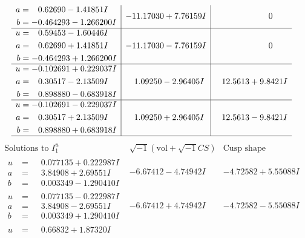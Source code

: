 \documentclass[1p]{elsarticle_modified}
\theoremstyle{definition}
\newcommand{\I}{\sqrt{-1}}
\begin{document}
$$\begin{array}{c|c|c}
\begin{aligned}
a &= \phantom{-}0.62690 - 1.41851 I \\
b &= -0.464293 - 1.266200 I\end{aligned}
 & -11.17030 + 7.76159 I & \phantom{-0.000000 } 0 \\ \hline\begin{aligned}
u &= \phantom{-}0.59453 - 1.60446 I \\
a &= \phantom{-}0.62690 + 1.41851 I \\
b &= -0.464293 + 1.266200 I\end{aligned}
 & -11.17030 - 7.76159 I & \phantom{-0.000000 } 0 \\ \hline\begin{aligned}
u &= -0.102691 + 0.229037 I \\
a &= \phantom{-}0.30517 - 2.13509 I \\
b &= \phantom{-}0.898880 - 0.683918 I\end{aligned}
 & \phantom{-}1.09250 - 2.96405 I & \phantom{-}12.5613 + 9.8421 I \\ \hline\begin{aligned}
u &= -0.102691 - 0.229037 I \\
a &= \phantom{-}0.30517 + 2.13509 I \\
b &= \phantom{-}0.898880 + 0.683918 I\end{aligned}
 & \phantom{-}1.09250 + 2.96405 I & \phantom{-}12.5613 - 9.8421 I\\
 \hline 
 \end{array}$$\newpage$$\begin{array}{c|c|c}  
\text{Solutions to }I^u_{1}& \I (\text{vol} + \sqrt{-1}CS) & \text{Cusp shape}\\
 \hline 
\begin{aligned}
u &= \phantom{-}0.077135 + 0.222987 I \\
a &= \phantom{-}3.84908 + 2.69551 I \\
b &= \phantom{-}0.003349 - 1.290410 I\end{aligned}
 & -6.67412 - 4.74942 I & -4.72582 + 5.55088 I \\ \hline\begin{aligned}
u &= \phantom{-}0.077135 - 0.222987 I \\
a &= \phantom{-}3.84908 - 2.69551 I \\
b &= \phantom{-}0.003349 + 1.290410 I\end{aligned}
 & -6.67412 + 4.74942 I & -4.72582 - 5.55088 I \\ \hline\begin{aligned}
u &= \phantom{-}0.66832 + 1.87320 I \\

\end{aligned}
\end{array}$$
\end{document}
